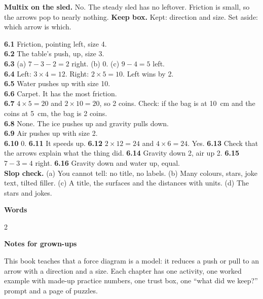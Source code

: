 \textbf{Multix on the sled.} No. The steady sled has no leftover. Friction is small, so the arrows pop to nearly nothing. \textbf{Keep box.} Kept: direction and size. Set aside: which arrow is which.

\textbf{6.1} Friction, pointing left, size 4.\\
\textbf{6.2} The table's push, up, size 3.\\
\textbf{6.3} (a) $7-3-2=2$ right. (b) 0. (c) $9-4=5$ left.\\
\textbf{6.4} Left: $3\times4=12$. Right: $2\times5=10$. Left wins by 2.\\
\textbf{6.5} Water pushes up with size 10.\\
\textbf{6.6} Carpet. It has the most friction.\\
\textbf{6.7} $4\times5=20$ and $2\times10=20$, so 2 coins. Check: if the bag is at 10~cm and the coins at 5~cm, the bag is 2 coins.\\
\textbf{6.8} None. The ice pushes up and gravity pulls down.\\
\textbf{6.9} Air pushes up with size 2.\\
\textbf{6.10} 0. \textbf{6.11} It speeds up. \textbf{6.12} $2\times12=24$ and $4\times6=24$. Yes. \textbf{6.13} Check that the arrows explain what the thing did. \textbf{6.14} Gravity down 2, air up 2. \textbf{6.15} $7-3=4$ right. \textbf{6.16} Gravity down and water up, equal.\\
\textbf{Slop check.} (a) You cannot tell: no title, no labels. (b) Many colours, stars, joke text, tilted filler. (c) A title, the surfaces and the distances with units. (d) The stars and jokes.

\clearpage\label{notes}
{\sans\bfseries\LARGE\color{ink} Words}\par
\small
\begin{multicols}{2}
\end{multicols}

\vspace{0.4em}
{\sans\bfseries\large\color{sky!70!black} Notes for grown-ups}\par
This book teaches that a force diagram is a model: it reduces a push or pull to an arrow with a direction and a size. Each chapter has one activity, one worked example with made-up practice numbers, one trust box, one ``what did we keep?'' prompt and a page of puzzles.

